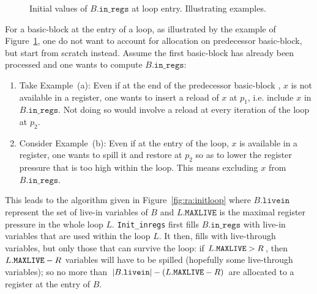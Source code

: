 {\begin{figure}
  \begin{center}
    \qquad
  \end{center}
  \caption{\label{fig:ra:loopentry_example}Initial values of $B.\texttt{in\_regs}$ at loop entry. Illustrating examples.}
\end{figure}
For a basic-block at the entry of a loop, as illustrated by the example of Figure~\ref{fig:ra:loopentry_example}, one do not want to account for allocation on predecessor basic-block, but start from scratch instead.
Assume the first basic-block has already been processed and one wants to compute $B.\texttt{in\_regs}$:
\begin{enumerate}
\item Take Example~(a): 
  Even if at the end of the predecessor basic-block , $x$ is not available in a register, one wants to insert a reload of $x$ at $p_1$, i.e. include $x$ in $B.\texttt{in\_regs}$.
  Not doing so would involve a reload at every iteration of the loop at $p_2$. 
\item Consider Example~(b): 
  Even if at the entry of the loop, $x$ is available in a register, one wants to spill it and restore at $p_2$ so as to lower the register pressure that is too high within the loop.
  This means excluding $x$ from $B.\texttt{in\_regs}$.
\end{enumerate}
This leads to the algorithm given in Figure~\ref{fig:ra:initloop} where $B.\texttt{livein}$ represent the set of live-in variables of $B$ and $L.\texttt{MAXLIVE}$ is the maximal register pressure in the whole loop $L$.
\texttt{Init\_inregs} first fills $B.\texttt{in\_regs}$ with live-in variables that are used within the loop $L$.
It then, fills with live-through variables, but only those that can survive the loop:
if $L.\texttt{MAXLIVE}>R$, then  $L.\texttt{MAXLIVE}-R$ variables will have to be spilled (hopefully some live-through variables);
so no more than $|B.\texttt{livein}|-(L.\texttt{MAXLIVE}-R)$ are allocated to a register at the entry of $B$.

}
